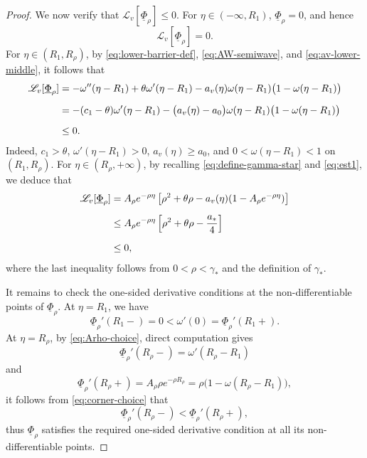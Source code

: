 \documentclass[preprint,sort&compress,final,12pt]{elsarticle}
\numberwithin{equation}{section}
\begin{document}
\begin{proof}
We now verify that $\mathscr L_v[\underline\Phi_\rho]\le0$. For $\eta\in(-\infty,R_1)$, $\underline\Phi_\rho=0$, and hence
\begin{equation*}
\mathscr L_v[\underline\Phi_\rho]=0.
\end{equation*}
For $\eta\in(R_1,R_{\rho})$, by \eqref{eq:lower-barrier-def}, \eqref{eq:AW-semiwave}, and \eqref{eq:av-lower-middle}, it follows that
\begin{align*}
\mathscr L_v[\underline\Phi_\rho]
&=-\omega''(\eta-R_1)+\theta\omega'(\eta-R_1)
-a_v(\eta)\omega(\eta-R_1)\bigl(1-\omega(\eta-R_1)\bigr)\notag\\[0.2cm]
&=-(c_1-\theta)\omega'(\eta-R_1)
-\bigl(a_v(\eta)-a_0\bigr)
\omega(\eta-R_1)\bigl(1-\omega(\eta-R_1)\bigr)\notag\\[0.2cm]
&\le0.
\end{align*}
Indeed, $c_1>\theta$, $\omega'(\eta-R_1)>0$, $a_v(\eta)\ge a_0$, and $0<\omega(\eta-R_1)<1$ on $(R_1,R_\rho)$.
For $\eta\in(R_\rho,+\infty)$, by recalling \eqref{eq:define-gamma-star} and \eqref{eq:est1}, we deduce that
\begin{align*}
\mathscr L_v[\underline\Phi_\rho]
&=A_\rho e^{-\rho\eta}
\left[\rho^2+\theta\rho-a_v(\eta)(1-A_\rho e^{-\rho\eta})\right]\notag\\[0.2cm]
&\le A_\rho e^{-\rho\eta}
\left[\rho^2+\theta\rho-\frac{a_*}{4}\right]\notag\\[0.2cm]
&\le0,
\end{align*}
where the last inequality follows from $0<\rho<\gamma_*$ and the definition of $\gamma_*$.


It remains to check the one-sided derivative conditions at the non-differentiable points of $\underline\Phi_\rho$. At $\eta=R_1$, we have
\begin{equation*}
\underline\Phi_\rho'(R_1-)=0<\omega'(0)=\underline\Phi_\rho'(R_1+).
\end{equation*}
At $\eta=R_\rho$, by \eqref{eq:Arho-choice}, direct computation gives
\begin{equation*}
\underline\Phi_\rho'(R_\rho-)=\omega'(R_\rho-R_1)
\end{equation*}
and
\begin{equation*}
\underline\Phi_\rho'(R_\rho+)
=A_\rho\rho e^{-\rho R_\rho}
=\rho\bigl(1-\omega(R_\rho-R_1)\bigr),
\end{equation*}
it follows from \eqref{eq:corner-choice} that
\begin{equation*}
\underline\Phi_\rho'(R_\rho-)<\underline\Phi_\rho'(R_\rho+),
\end{equation*}
thus $\underline\Phi_\rho$ satisfies the required one-sided derivative condition at all its non-differentiable points.


\end{proof}
\end{document}
